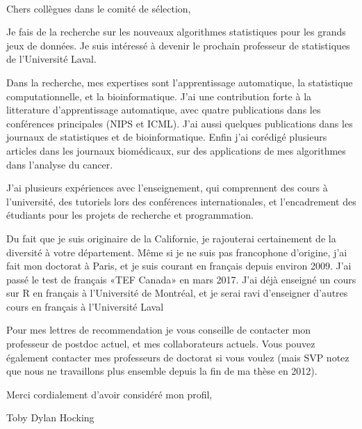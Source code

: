 \documentclass{article}
\begin{document}
\mbox{ }

Chers collègues dans le comité de sélection,

Je fais de la recherche sur les nouveaux algorithmes statistiques pour
les grands jeux de données. Je suis intéressé à devenir le prochain
professeur de statistiques de l'Université Laval.

Dans la recherche, mes expertises sont l'apprentissage automatique, la
statistique computationnelle, et la bioinformatique. J'ai une
contribution forte à la litterature d'apprentissage automatique, avec
quatre publications dans les conférences principales (NIPS et
ICML). J'ai aussi quelques publications dans les journaux de
statistiques et de bioinformatique. Enfin j'ai corédigé plusieurs
articles dans les journaux biomédicaux, sur des applications de mes
algorithmes dans l'analyse du cancer.
 
J'ai plusieurs expériences avec l'enseignement, qui comprennent des cours
à l'université, des tutoriels lors des conférences internationales, et
l'encadrement des étudiants pour les projets de recherche et
programmation.

Du fait que je suis originaire de la Californie, je rajouterai
certainement de la diversité à votre département. Même si je ne suis
pas francophone d'origine, j'ai fait mon doctorat à Paris, et je suis
courant en français depuis environ 2009. J'ai passé le test de
français «TEF Canada» en mars 2017. J'ai déjà enseigné un cours sur R
en français à l'Université de Montréal, et je serai ravi d'enseigner
d'autres cours en français à l'Université Laval

Pour mes lettres de recommendation je vous conseille de contacter mon
professeur de postdoc actuel, et mes collaborateurs actuels. Vous
pouvez également contacter mes professeurs de doctorat si vous voulez
(mais SVP notez que nous ne travaillons plus ensemble depuis la fin de
ma thèse en 2012).

Merci cordialement d'avoir considéré mon profil, 

Toby Dylan Hocking
\end{document}
